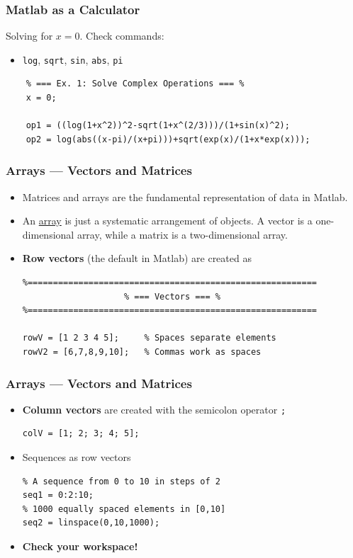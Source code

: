 \documentclass[11pt,xcolor={svgnames},aspectratio=169,usepdftitle=false]{beamer}
\begin{document}
\begin{frame}[fragile]
    \frametitle{Matlab as a Calculator}
    Solving for $x = 0$. Check commands:
    \begin{itemize}
        \item \verb;log;, \verb;sqrt;, \verb;sin;, \verb;abs;, \verb;pi;
    \end{itemize}
\begin{lstlisting}
    % === Ex. 1: Solve Complex Operations === %
    x = 0;
    
    op1 = ((log(1+x^2))^2-sqrt(1+x^(2/3)))/(1+sin(x)^2);
    op2 = log(abs((x-pi)/(x+pi)))+sqrt(exp(x)/(1+x*exp(x)));
\end{lstlisting}
\end{frame}

\begin{frame}[fragile]
    \frametitle{Arrays --- Vectors and Matrices}
\begin{itemize}
    \item Matrices and arrays are the fundamental representation of data in Matlab.
    \item An \href{https://en.wikipedia.org/wiki/Array}{array} is just a systematic arrangement of objects. A vector is a one-dimensional array, while a matrix is a two-dimensional array.
    \item \alert{\textbf{Row vectors}} (the default in Matlab) are created as
\begin{lstlisting}
%=========================================================
                    % === Vectors === %
%=========================================================

rowV = [1 2 3 4 5];     % Spaces separate elements
rowV2 = [6,7,8,9,10];   % Commas work as spaces
\end{lstlisting}
\end{itemize}
\end{frame}

\begin{frame}[fragile]
    \frametitle{Arrays --- Vectors and Matrices}
\begin{itemize}
    \item \alert{\textbf{Column vectors}} are created with the semicolon operator \verb+;+
\begin{lstlisting}
colV = [1; 2; 3; 4; 5];
\end{lstlisting}
    \item Sequences as row vectors
\begin{lstlisting}
% A sequence from 0 to 10 in steps of 2
seq1 = 0:2:10;
% 1000 equally spaced elements in [0,10]
seq2 = linspace(0,10,1000);
\end{lstlisting}
    \item \alert{\textbf{Check your workspace!}}
\end{itemize}
\end{frame}
\end{document}
